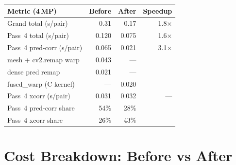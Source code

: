 \documentclass[10pt,a4paper,twocolumn]{article}
\begin{document}
\begin{center}
\small
\begin{tabular}{@{}lrrr@{}}
\toprule
\textbf{Metric (4\,MP)} & \textbf{Before} & \textbf{After} & \textbf{Speedup} \\
\midrule
Grand total (s/pair) & 0.31 & 0.17 & 1.8$\times$ \\
Pass~4 total (s/pair) & 0.120 & 0.075 & 1.6$\times$ \\
\rowcolor{lightgray}
Pass~4 pred-corr (s/pair) & 0.065 & 0.021 & 3.1$\times$ \\
\quad mesh + cv2.remap warp & 0.043 & --- & \\
\quad dense pred remap & 0.021 & --- & \\
\quad fused\_warp (C kernel) & --- & 0.020 & \\
Pass~4 xcorr (s/pair) & 0.031 & 0.032 & --- \\
\midrule
Pass~4 pred-corr share & 54\% & 28\% & \\
Pass~4 xcorr share & 26\% & 43\% & \\
\bottomrule
\end{tabular}
\end{center}

\section{Cost Breakdown: Before vs After}
\end{document}
